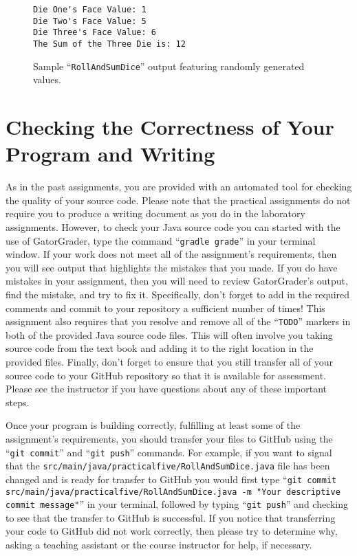 \documentclass[11pt]{article}
\newcommand{\mainprogramsource}{\lstinline{src/main/java/practicalfive/RollAndSumDice.java}}
\newcommand{\gatorgraderstart}{\command{gradle grade}}
\newcommand{\gitcommit}{\command{git commit}}
\newcommand{\gitpush}{\command{git push}}
\newcommand{\gitcommitmainprogram}{\command{git commit src/main/java/practicalfive/RollAndSumDice.java -m "Your
descriptive commit message"}}
\newcommand{\command}[1]{``\lstinline{#1}''}
\begin{document}
\begin{figure}[tb]
\begin{Verbatim}[commandchars=\\\{\}]
Die One's Face Value: 1
Die Two's Face Value: 5
Die Three's Face Value: 6
The Sum of the Three Die is: 12
\end{Verbatim}
\vspace*{-.1in}
\caption{Sample ``{\tt RollAndSumDice}'' output featuring randomly generated values.}
\label{mad}
\end{figure}

\section*{Checking the Correctness of Your Program and Writing}

As in the past assignments, you are provided with an automated tool for checking
the quality of your source code. Please note that the practical assignments do
not require you to produce a writing document as you do in the laboratory
assignments. However, to check your Java source code you can started with the
use of GatorGrader, type the command \gatorgraderstart{} in your terminal
window. If your work does not meet all of the assignment's requirements, then
you will see output that highlights the mistakes that you made. If you do have
mistakes in your assignment, then you will need to review GatorGrader's output,
find the mistake, and try to fix it. Specifically, don't forget to add in the
required comments and commit to your repository a sufficient number of times!
This assignment also requires that you resolve and remove all of the
\command{TODO} markers in both of the provided Java source code files. This will
often involve you taking source code from the text book and adding it to the
right location in the provided files. Finally, don't forget to ensure that you
still transfer all of your source code to your GitHub repository so that it is
available for assessment. Please see the instructor if you have questions about
any of these important steps.

Once your program is building correctly, fulfilling at least some of the
assignment's requirements, you should transfer your files to GitHub using the
\gitcommit{} and \gitpush{} commands. For example, if you want to signal that
the \mainprogramsource{} file has been changed and is ready for transfer to
GitHub you would first type \gitcommitmainprogram{} in your terminal, followed
by typing \gitpush{} and checking to see that the transfer to GitHub is
successful. If you notice that transferring your code to GitHub did not work
correctly, then please try to determine why, asking a teaching assistant or the
course instructor for help, if necessary.
\end{document}
